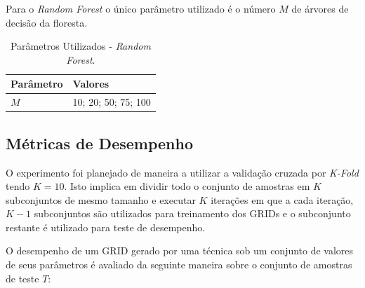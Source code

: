 \documentclass[12pt]{article}
\begin{document}
        Para o \textit{Random Forest} o único parâmetro utilizado é o número $M$ de árvores de decisão da floresta.
        
        \begin{table}[!ht]
        \centering
        \caption{Parâmetros Utilizados - \textit{Random Forest}.}
        \label{table:parametersRF}
        \begin{tabular}{ | l | l | } \hline
        \textbf{Parâmetro} & \textbf{Valores} \\ \hline
        $M$ & 10; 20; 50; 75; 100 \\ \hline
        \end{tabular}
        \end{table}
            
        \subsection{Métricas de Desempenho}
        \label{sec:metricas}
        
        O experimento foi planejado de maneira a utilizar a validação cruzada por \textit{K-Fold} tendo $K = 10$. Isto implica em dividir todo o conjunto de amostras em $K$ subconjuntos de mesmo tamanho e executar $K$ iterações em que a cada iteração, $K-1$ subconjuntos são utilizados para treinamento dos GRIDs e o subconjunto restante é utilizado para teste de desempenho. 
        
        O desempenho de um GRID gerado por uma técnica sob um conjunto de valores de seus parâmetros é avaliado da seguinte maneira sobre o conjunto de amostras de teste $T$:
        
\end{document}
